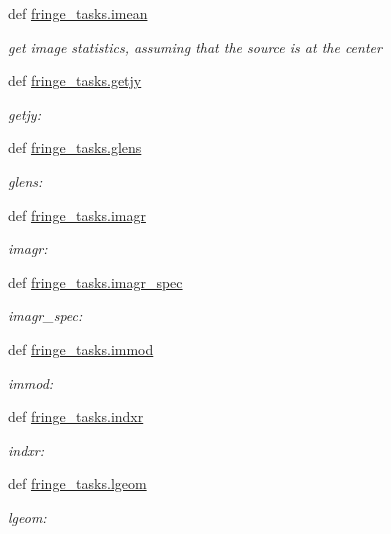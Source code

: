 \begin{DoxyCompactItemize}
def \hyperlink{namespacefringe__tasks_a5f4412285ebbc9b8bfa52dac3013971d}{fringe\-\_\-tasks.\-imean}
\begin{DoxyCompactList}\small\item\em get image statistics, assuming that the source is at the center \end{DoxyCompactList}\item 
def \hyperlink{namespacefringe__tasks_a70bedc36e17d450c738de38d5e181950}{fringe\-\_\-tasks.\-getjy}
\begin{DoxyCompactList}\small\item\em getjy\-: \end{DoxyCompactList}\item 
def \hyperlink{namespacefringe__tasks_a6218cbbf14296bde7a4d3c34df810881}{fringe\-\_\-tasks.\-glens}
\begin{DoxyCompactList}\small\item\em glens\-: \end{DoxyCompactList}\item 
def \hyperlink{namespacefringe__tasks_a2b556d9b42b51e0cd2d5d85bb78b4131}{fringe\-\_\-tasks.\-imagr}
\begin{DoxyCompactList}\small\item\em imagr\-: \end{DoxyCompactList}\item 
def \hyperlink{namespacefringe__tasks_a8933e5caa44cb2352a73fd4db3243342}{fringe\-\_\-tasks.\-imagr\-\_\-spec}
\begin{DoxyCompactList}\small\item\em imagr\-\_\-spec\-: \end{DoxyCompactList}\item 
def \hyperlink{namespacefringe__tasks_a04f06940eebbbba2a7654fa55f0186a6}{fringe\-\_\-tasks.\-immod}
\begin{DoxyCompactList}\small\item\em immod\-: \end{DoxyCompactList}\item 
def \hyperlink{namespacefringe__tasks_a3cc971405e68663139f08f401a2c1630}{fringe\-\_\-tasks.\-indxr}
\begin{DoxyCompactList}\small\item\em indxr\-: \end{DoxyCompactList}\item 
def \hyperlink{namespacefringe__tasks_adab9a7999fbfdd188472dadeb3f90061}{fringe\-\_\-tasks.\-lgeom}
\begin{DoxyCompactList}\small\item\em lgeom\-: \end{DoxyCompactList}\item 

\end{DoxyCompactItemize}
